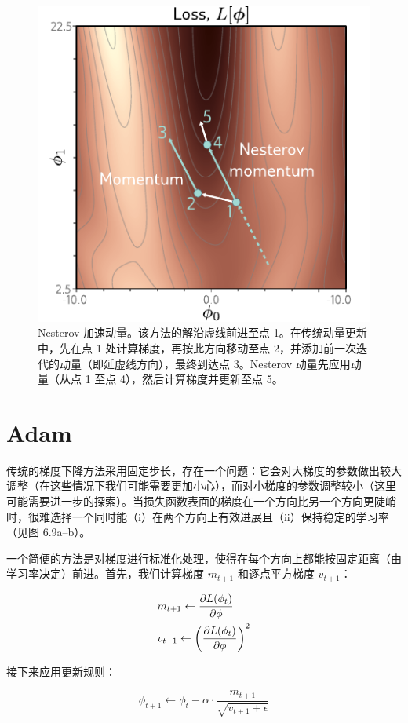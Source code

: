 \documentclass[lang=cn,newtx,10pt,scheme=chinese]{elegantbook}
\begin{document}
\begin{figure}[ht!]
\centering
\includegraphics[width=0.7\linewidth]{PDFFigures/UDLChap6PDF/TrainNesterov.pdf}
\caption{Nesterov 加速动量。该方法的解沿虚线前进至点 1。在传统动量更新中，先在点 1 处计算梯度，再按此方向移动至点 2，并添加前一次迭代的动量（即延虚线方向），最终到达点 3。Nesterov 动量先应用动量（从点 1 至点 4），然后计算梯度并更新至点 5。}
\end{figure}

\section{Adam}
传统的梯度下降方法采用固定步长，存在一个问题：它会对大梯度的参数做出较大调整（在这些情况下我们可能需要更加小心），而对小梯度的参数调整较小（这里可能需要进一步的探索）。当损失函数表面的梯度在一个方向比另一个方向更陡峭时，很难选择一个同时能（i）在两个方向上有效进展且（ii）保持稳定的学习率（见图 6.9a–b）。

一个简便的方法是对梯度进行标准化处理，使得在每个方向上都能按固定距离（由学习率决定）前进。首先，我们计算梯度 \(m_{t+1}\) 和逐点平方梯度 \(v_{t+1}\)：

\begin{align}
& m_{t+1} \leftarrow \frac{\partial L(\phi_t)}{\partial \phi} \notag \\
& v_{t+1} \leftarrow \left( \frac{\partial L(\phi_t)}{\partial \phi} \right)^2
\end{align}


接下来应用更新规则：

\begin{equation}
\phi_{t+1} \leftarrow \phi_t - \alpha \cdot \frac{m_{t+1}}{\sqrt{v_{t+1} + \epsilon}} 
\end{equation}
\end{document}
